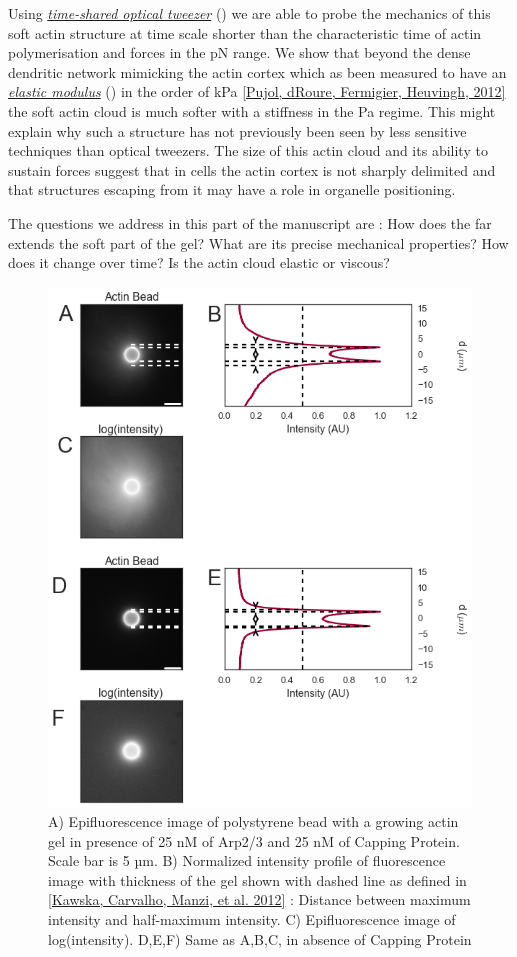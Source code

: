 \documentclass[A4paperpaper,11pt,english]{sphinxmanual}
\begin{document}
Using {\hyperref[index-latex:time-shared-ot]{\emph{time-shared optical tweezer}}} () we are able to probe
the mechanics of this soft actin structure at time scale shorter than the
characteristic time of actin polymerisation and forces in the pN range. We show
that beyond the dense dendritic network mimicking the actin cortex which as
been measured to have an {\hyperref[index-latex:elastic-modulus]{\emph{elastic modulus}}} () in the order of
kPa {\hyperref[index-latex:pujol2012]{{[}Pujol, dRoure, Fermigier, Heuvingh,  2012{]}}} the soft actin cloud is much softer with
a stiffness in the Pa regime.  This might explain why such a
structure has not previously been seen by less sensitive techniques than optical
tweezers. The size of this actin cloud and its ability to sustain forces
suggest that in cells the actin cortex is not sharply delimited and that
structures escaping from it may have a role in organelle positioning.

The questions we address in this part of the manuscript are :  How does the far
extends the soft part of the gel? What are its precise mechanical properties?  How does it change
over time?  Is the actin cloud elastic or viscous?
\begin{figure}[htbp]
\centering
\capstart

\includegraphics[width=0.800\linewidth]{intensity_profile_xnM_Arp_xnM_CP_xmin.png}
\caption{A) Epifluorescence image of polystyrene bead with a growing actin gel in
presence of 25 nM of Arp2/3 and 25 nM of Capping Protein. Scale bar is 5
µm.  B) Normalized intensity profile of fluorescence image with thickness
of the gel shown with dashed line as defined in {\hyperref[index-latex:kawska2012]{{[}Kawska, Carvalho, Manzi,  et al.  2012{]}}} :
Distance between maximum intensity and half-maximum intensity.  C)
Epifluorescence image of log(intensity). D,E,F) Same as A,B,C, in absence
of Capping Protein}\label{index-latex:fig-intensity-profile}\end{figure}
\end{document}
